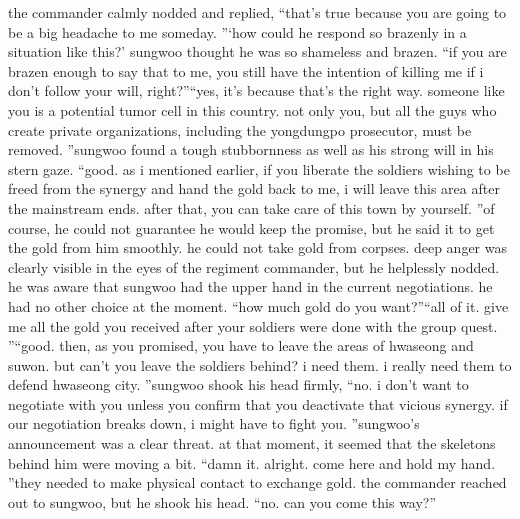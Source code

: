 the commander calmly nodded and replied, “that’s true because you are going to be a big headache to me someday.
”‘how could he respond so brazenly in a situation like this?’ sungwoo thought he was so shameless and brazen.
“if you are brazen enough to say that to me, you still have the intention of killing me if i don’t follow your will, right?”“yes, it’s because that’s the right way.
 someone like you is a potential tumor cell in this country.
 not only you, but all the guys who create private organizations, including the yongdungpo prosecutor, must be removed.
”sungwoo found a tough stubbornness as well as his strong will in his stern gaze.
“good.
 as i mentioned earlier, if you liberate the soldiers wishing to be freed from the synergy and hand the gold back to me, i will leave this area after the mainstream ends.
 after that, you can take care of this town by yourself.
”of course, he could not guarantee he would keep the promise, but he said it to get the gold from him smoothly.
 he could not take gold from corpses.
deep anger was clearly visible in the eyes of the regiment commander, but he helplessly nodded.
 he was aware that sungwoo had the upper hand in the current negotiations.
 he had no other choice at the moment.
“how much gold do you want?”“all of it.
 give me all the gold you received after your soldiers were done with the group quest.
”“good.
 then, as you promised, you have to leave the areas of hwaseong and suwon.
 but can’t you leave the soldiers behind? i need them.
 i really need them to defend hwaseong city.
”sungwoo shook his head firmly, “no.
 i don’t want to negotiate with you unless you confirm that you deactivate that vicious synergy.
 if our negotiation breaks down, i might have to fight you.
”sungwoo’s announcement was a clear threat.
 at that moment, it seemed that the skeletons behind him were moving a bit.
“damn it.
 alright.
 come here and hold my hand.
”they needed to make physical contact to exchange gold.
 the commander reached out to sungwoo, but he shook his head.
“no.
 can you come this way?”

 